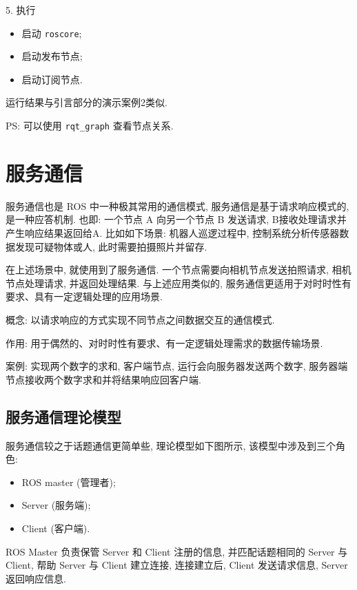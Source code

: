 \documentclass[openany, fontset=windowsold]{ctexbook}
\theoremstyle{kaiti}
\theoremstyle{normal}
\begin{document}
5. 执行

\begin{itemize}
  \item 启动 \verb|roscore|;
  \item 启动发布节点;
  \item 启动订阅节点.
\end{itemize}

运行结果与引言部分的演示案例2类似.

PS: 可以使用 \verb|rqt_graph| 查看节点关系.

\section{服务通信}

服务通信也是 ROS 中一种极其常用的通信模式, 服务通信是基于请求响应模式的, 是一种应答机制. 也即: 一个节点 A 向另一个节点 B 发送请求, B接收处理请求并产生响应结果返回给A. 比如如下场景: 机器人巡逻过程中, 控制系统分析传感器数据发现可疑物体或人, 此时需要拍摄照片并留存.

在上述场景中, 就使用到了服务通信. 一个节点需要向相机节点发送拍照请求, 相机节点处理请求, 并返回处理结果. 与上述应用类似的, 服务通信更适用于对时时性有要求、具有一定逻辑处理的应用场景.

概念: 以请求响应的方式实现不同节点之间数据交互的通信模式.

作用: 用于偶然的、对时时性有要求、有一定逻辑处理需求的数据传输场景.

案例: 实现两个数字的求和, 客户端节点, 运行会向服务器发送两个数字, 服务器端节点接收两个数字求和并将结果响应回客户端.

\subsection{服务通信理论模型}

服务通信较之于话题通信更简单些, 理论模型如下图所示, 该模型中涉及到三个角色:

\begin{itemize}
  \item ROS master (管理者);
  \item Server (服务端);
  \item Client (客户端).
\end{itemize}

ROS Master 负责保管 Server 和 Client 注册的信息, 并匹配话题相同的 Server 与 Client, 帮助 Server 与 Client 建立连接, 连接建立后, Client 发送请求信息, Server 返回响应信息.
\end{document}
